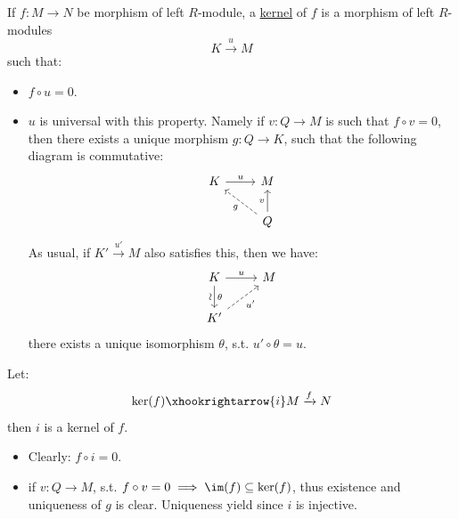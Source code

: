 \begin{definition}
	If \( f: M\to N \) be morphism of left \( R \)-module, a \underline{kernel} of \( f \) is a
	morphism of left \( R \)-modules
	\[
		K \xrightarrow{u} M
	\]
	such that:
	\begin{itemize}
		\item \( f\circ u = 0 \).
		\item \( u \) is universal with this property. Namely if \( v: Q \to M \) is such that \( f\circ
		      v = 0\), then there exists a unique morphism \( g: Q \to K \), such that the following diagram
		      is commutative:
		      \[
			      \begin{tikzcd}
				      K \arrow[r, "u"] & M \\
				      & Q\arrow[lu, "g", dashed] \arrow[u, "v"]
			      \end{tikzcd}
		      \]
		      As usual, if \( K' \xrightarrow{u'} M \) also satisfies this, then we have:
		      \[
			      \begin{tikzcd}
				      K \arrow[r, "u"] \arrow[d, "\theta", "\sim"' {sloped, allow upside down, pos=0.5}] & M \\
				      K' \arrow[ur, dashed, "u'"'] &
			      \end{tikzcd}
		      \]
		      there exists a unique isomorphism \( \theta  \), s.t. \( u' \circ \theta = u \).
	\end{itemize}
\end{definition}

\begin{claim}
	Let:
	\[
		\ker(f) \xhookrightarrow{i} M \xrightarrow{f} N
	\]
	then \( i \) is a kernel of \( f \).
	\begin{itemize}
		\item Clearly: \( f\circ i = 0 \).
		\item if \( v: Q \to M \), s.t. \( f\circ v = 0 \implies \im (f) \subseteq \ker(f) \), thus
		      existence and uniqueness of \( g \) is clear. Uniqueness yield since \( i \)
		      is injective.
	\end{itemize}
\end{claim}

